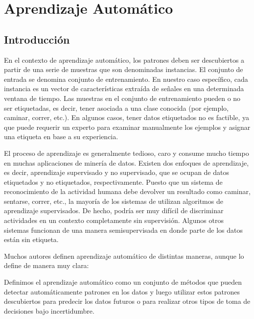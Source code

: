 
\chapter{Aprendizaje Automático}
\label{chap:Aprendizaje-Automatico}

\section{Introducción}
En el contexto de aprendizaje automático, los patrones deben ser descubiertos a partir de una serie de muestras que son denominadas instancias. El conjunto de entrada se denomina conjunto de entrenamiento. En nuestro caso específico, cada instancia es un vector de características extraída de señales en una determinada ventana de tiempo. Las muestras en el conjunto de entrenamiento pueden o no ser etiquetadas, es decir, tener asociada a una clase conocida (por ejemplo, caminar, correr, etc.). En algunos casos, tener datos etiquetados no es factible, ya que puede requerir un experto para examinar manualmente los ejemplos y asignar una etiqueta en base a su experiencia.

El proceso de aprendizaje es generalmente tedioso, caro y consume mucho tiempo en muchas aplicaciones de minería de datos. Existen dos enfoques de aprendizaje, es decir, aprendizaje supervisado y no supervisado, que se ocupan de datos etiquetados y no etiquetados, respectivamente. Puesto que un sistema de reconocimiento de la actividad humana debe devolver un resultado como caminar, sentarse, correr, etc., la mayoría de los sistemas de  utilizan algoritmos de aprendizaje supervisados. De hecho, podría ser muy difícil de discriminar actividades en un contexto completamente sin supervisión. Algunos otros sistemas funcionan de una manera semisupervisada en donde parte de los datos están sin etiqueta.

Muchos autores definen aprendizaje automático de distintas maneras, aunque \cite{Murphy:2012:MLP:2380985} lo define de manera muy clara:

\vspace{5mm}

\begin{definition} 
    \label{def3:ml}Definimos el aprendizaje automático como un conjunto de métodos que pueden detectar automáticamente patrones en los datos y luego utilizar estos patrones descubiertos para predecir los datos futuros o para realizar otros tipos de toma de decisiones bajo incertidumbre.
\end{definition}

